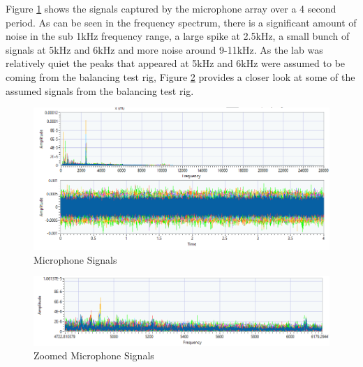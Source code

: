 \documentclass{UoNMCHA}
\numberwithin{equation}{section}
\begin{document}
    Figure \ref{fig:mic signals lab test} shows the signals captured by the microphone array over a 4 second period. As can be seen in the frequency spectrum, there is a significant amount of noise in the sub 1kHz frequency range, a large spike at 2.5kHz, a small bunch of signals at 5kHz and 6kHz and more noise around 9-11kHz. As the lab was relatively quiet the peaks that appeared at 5kHz and 6kHz were assumed to be coming from the balancing test rig, Figure \ref{fig:zoom mic signals lab test} provides a closer look at some of the assumed signals from the balancing test rig.
    
    \begin{figure} [H]
        \centering
        \includegraphics[keepaspectratio, width = \textwidth]{Figures/Raw Sound Waves.png}
        \caption{Microphone Signals}
        \label{fig:mic signals lab test}
    \end{figure}
    
    \begin{figure} [H]
        \centering
        \includegraphics[keepaspectratio, width = \textwidth]{Figures/Zoomed Sound Waves.png}
        \caption{Zoomed Microphone Signals}
        \label{fig:zoom mic signals lab test}
    \end{figure}
    
\end{document}
